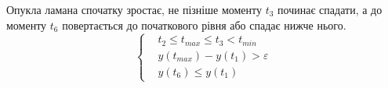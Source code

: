 Опукла ламана спочатку зростає, не пізніше моменту $t_3$ починає спадати,
а до моменту $t_6$ повертається до початкового рівня або спадає нижче нього.
\begin{equation*}
  \begin{cases}
    &t_2 \le t_{max} \le t_3 < t_{min} \\
    &y\left( t_{max} \right) - y\left( t_1\right) > \varepsilon \\
    &y\left( t_6 \right) \le y\left( t_1 \right)
  \end{cases}
\end{equation*}
